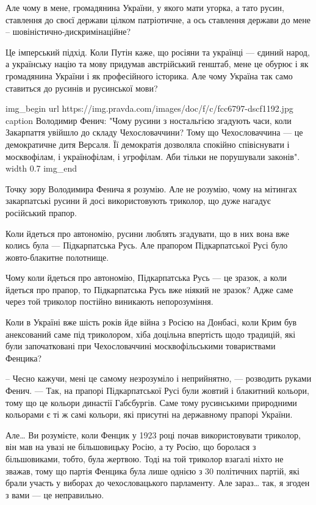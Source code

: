 Але чому в мене, громадянина України, у якого мати угорка, а тато русин,
ставлення до своєї держави цілком патріотичне, а ось ставлення держави до мене
– шовіністично-дискримінаційне?

Це імперський підхід. Коли Путін каже, що росіяни та українці --- єдиний народ, а
українську націю та мову придумав австрійський генштаб, мене це обурює і як
громадянина України і як професійного історика. Але чому Україна так само
ставиться до русинів и русинської мови?

\ifcmt
img_begin 
        url https://img.pravda.com/images/doc/f/c/fcc6797-dscf1192.jpg
        caption Володимир Фенич: "Чому русини з ностальгією згадують часи, коли Закарпаття увійшло до складу Чехословаччини? Тому що Чехословаччина --- це демократичне дитя Версаля. Її демократія дозволяла спокійно співіснувати і москвофілам, і українофілам, і угрофілам. Аби тільки не порушували законів".
        width 0.7
img_end
\fi

Точку зору Володимира Фенича я розумію. Але не розумію, чому на мітингах
закарпатські русини й досі використовують триколор, що дуже нагадує російський
прапор.

Коли йдеться про автономію, русини люблять згадувати, що в них вона вже колись
була --- Підкарпатська Русь. Але прапором Підкарпатської Русі було жовто-блакитне
полотнище.

Чому коли йдеться про автономію, Підкарпатська Русь --- це зразок, а коли йдеться
про прапор, то Підкарпатська Русь вже ніякий не зразок? Адже саме через той
триколор постійно виникають непорозуміння.  

Коли в Україні вже шість років йде війна з Росією на Донбасі, коли Крим був
анексований саме під триколором, хіба доцільна впертість щодо традицій, які
були започатковані при Чехословаччині москвофільськими товариствами Фенцика?

– Чесно кажучи, мені це самому незрозуміло і неприйнятно, --- розводить руками
Фенич. --- Так, на прапорі Підкарпатської Русі були жовтий і блакитний кольори,
тому що це кольори династії Габсбургів. Саме тому русинськими природними
кольорами є ті ж самі кольори, які присутні на державному прапорі України.

Але… Ви розумієте, коли Фенцик у 1923 році почав використовувати триколор, він
мав на увазі не більшовицьку Росію, а ту Росію, що боролася з більшовиками,
тобто, була жертвою. Тоді на той триколор взагалі ніхто не зважав, тому що
партія Фенцика була лише однією з 30 політичних партій, які брали участь у
виборах до чехословацького парламенту. Але зараз… так, я згоден з вами --- це
неправильно.

